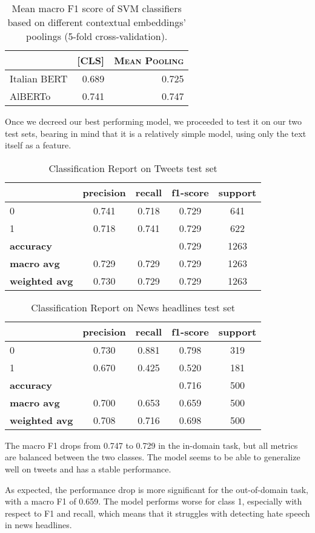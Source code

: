 \begin{table}
\caption{Mean macro F1 score of SVM classifiers based on different contextual embeddings' poolings (5-fold cross-validation).}
    \begin{tabular}{lrr}
        \toprule
        & \textsc{[CLS]} & \textsc{Mean Pooling} \\
        \midrule
        Italian BERT & 0.689 & 0.725 \\
        AlBERTo & 0.741 & 0.747 \\
        \bottomrule
    \end{tabular}
    \label{tbl:svm_f1_contextual_embs_pooling}
\end{table}

Once we decreed our best performing model, we proceeded to test it on our two test sets, bearing in mind that it is a relatively simple model, using only the text itself as a feature.

\begin{table}[h]
    \centering
    \begin{tabular}{lcccc}
        \toprule
        & \textbf{precision} & \textbf{recall} & \textbf{f1-score} & \textbf{support} \\
        \midrule
        0 & 0.741 & 0.718 & 0.729 & 641 \\
        1 & 0.718 & 0.741 & 0.729 & 622 \\
        \midrule
        \textbf{accuracy} & & & 0.729 & 1263 \\
        \textbf{macro avg} & 0.729 & 0.729 & 0.729 & 1263 \\
        \textbf{weighted avg} & 0.730 & 0.729 & 0.729 & 1263 \\
        \bottomrule
    \end{tabular}
    \caption{Classification Report on Tweets test set}
    \label{tab:classification_report_svm_alberto_tweets}
\end{table}

\begin{table}[h]
    \centering
    \begin{tabular}{lcccc}
        \toprule
        & \textbf{precision} & \textbf{recall} & \textbf{f1-score} & \textbf{support} \\
        \midrule
        0 & 0.730 & 0.881 & 0.798 & 319 \\
        1 & 0.670 & 0.425 & 0.520 & 181 \\
        \midrule
        \textbf{accuracy} & & & 0.716 & 500 \\
        \textbf{macro avg} & 0.700 & 0.653 & 0.659 & 500 \\
        \textbf{weighted avg} & 0.708 & 0.716 & 0.698 & 500 \\
        \bottomrule
    \end{tabular}
    \caption{Classification Report on News headlines test set}
    \label{tab:classification_report_svm_alberto_news}
\end{table}
The macro F1 drops from 0.747 to 0.729 in the in-domain task, but all metrics are balanced between the two classes. The model seems to be able to generalize well on tweets and has a stable performance.

As expected, the performance drop is more significant for the out-of-domain task, with a macro F1 of 0.659. The model performs worse for class 1, especially with respect to F1 and recall, which means that it struggles with detecting hate speech in news headlines.
